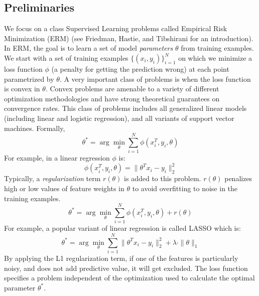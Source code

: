 \subsection{Preliminaries}

We focus on a class Supervised Learning problems called Empirical Risk Minimization (ERM) (see Friedman, Hastie, and Tibshirani \cite{friedman2001elements} for an introduction).
In ERM, the goal is to learn a set of model \emph{parameters} $\theta$ from training examples.
We start with a set of training examples $\{(x_{i},y_{i})\}_{i=1}^{N}$
on which we minimize a loss function $\phi$ (a penalty for getting the prediction wrong) at each point parametrized by $\theta$.
A very important class of problems is when the loss function is convex in $\theta$.
Convex problems are amenable to a variety of different optimization methodologies
and have strong theoretical guarantees on convergence rates.
This class of problems includes all generalized linear models (including linear and logistic regression), and all variants of support vector machines.
Formally,
\[
 \theta^{*}=\arg\min_{\theta}\sum_{i=1}^{N}\phi(x_{i}^T,y_{i},\theta)
\]
For example, in a linear regression $\phi$ is:
\[
\phi(x_{i}^T,y_{i},\theta) = \|\theta^Tx_{i} - y_i \|_2^2
\]
Typically, a \emph{regularization} term $r(\theta)$ is added to this problem.
$r(\theta)$ penalizes high or low values of feature weights in $\theta$ to avoid overfitting to noise in the training examples.
\[
 \theta^{*}=\arg\min_{\theta}\sum_{i=1}^{N}\phi(x_{i}^T,y_{i},\theta) + r(\theta)
\]
For example, a popular variant of linear regression is called LASSO which is:
\[
 \theta^{*}=\arg\min_{\theta}\sum_{i=1}^{N}\|\theta^Tx_{i} - y_i \|_2^2 + \lambda \cdot \|\theta\|_1
\]
By applying the L1 regularization term, if one of the features is particularly noisy, and does not add predictive value, it will get excluded.
The loss function specifies a problem independent of the optimization used to calculate the optimal parameter $\theta^{*}$.

